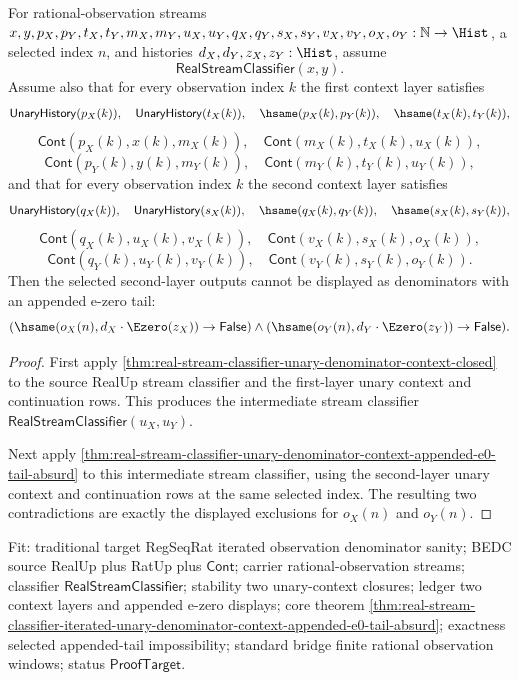 \begin{theorem}
\label{thm:real-stream-classifier-iterated-unary-denominator-context-appended-e0-tail-absurd}
For rational-observation streams
$x,y,p_X,p_Y,t_X,t_Y,m_X,m_Y,u_X,u_Y,q_X,q_Y,s_X,s_Y,v_X,v_Y,o_X,o_Y:
\mathbb{N}\to\Hist$, a selected index $n$, and histories
$d_X,d_Y,z_X,z_Y:\Hist$, assume
$$
\mathsf{RealStreamClassifier}(x,y).
$$
Assume also that for every observation index $k$ the first context layer
satisfies
$$
\mathsf{UnaryHistory}(p_X(k)),\quad \mathsf{UnaryHistory}(t_X(k)),\quad
\hsame(p_X(k),p_Y(k)),\quad \hsame(t_X(k),t_Y(k)),
$$
$$
\mathsf{Cont}(p_X(k),x(k),m_X(k)),\quad
\mathsf{Cont}(m_X(k),t_X(k),u_X(k)),
$$
$$
\mathsf{Cont}(p_Y(k),y(k),m_Y(k)),\quad
\mathsf{Cont}(m_Y(k),t_Y(k),u_Y(k)),
$$
and that for every observation index $k$ the second context layer satisfies
$$
\mathsf{UnaryHistory}(q_X(k)),\quad \mathsf{UnaryHistory}(s_X(k)),\quad
\hsame(q_X(k),q_Y(k)),\quad \hsame(s_X(k),s_Y(k)),
$$
$$
\mathsf{Cont}(q_X(k),u_X(k),v_X(k)),\quad
\mathsf{Cont}(v_X(k),s_X(k),o_X(k)),
$$
$$
\mathsf{Cont}(q_Y(k),u_Y(k),v_Y(k)),\quad
\mathsf{Cont}(v_Y(k),s_Y(k),o_Y(k)).
$$
Then the selected second-layer outputs cannot be displayed as denominators with
an appended e-zero tail:
$$
(\hsame(o_X(n),d_X\cdot\Ezero(z_X))\to\mathsf{False})\land
(\hsame(o_Y(n),d_Y\cdot\Ezero(z_Y))\to\mathsf{False}).
$$
\end{theorem}
\begin{proof}
First apply
\autoref{thm:real-stream-classifier-unary-denominator-context-closed} to the
source RealUp stream classifier and the first-layer unary context and
continuation rows. This produces the intermediate stream classifier
$\mathsf{RealStreamClassifier}(u_X,u_Y)$.

Next apply
\autoref{thm:real-stream-classifier-unary-denominator-context-appended-e0-tail-absurd}
to this intermediate stream classifier, using the second-layer unary context and
continuation rows at the same selected index. The resulting two contradictions
are exactly the displayed exclusions for $o_X(n)$ and $o_Y(n)$.
\end{proof}

Fit: traditional target RegSeqRat iterated observation denominator sanity; BEDC
source RealUp plus RatUp plus $\mathsf{Cont}$; carrier rational-observation
streams; classifier $\mathsf{RealStreamClassifier}$; stability two
unary-context closures; ledger two context layers and appended e-zero displays;
core theorem
\autoref{thm:real-stream-classifier-iterated-unary-denominator-context-appended-e0-tail-absurd};
exactness selected appended-tail impossibility; standard bridge finite rational
observation windows; status $\mathsf{ProofTarget}$.
